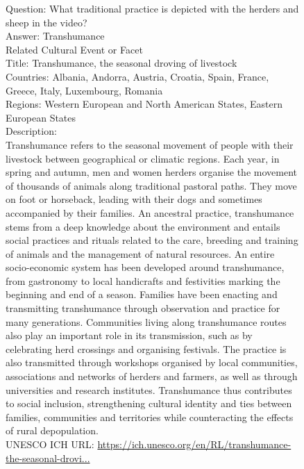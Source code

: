 \begin{figure}[H]
\begin{tcolorbox}[colback=gray!5!white,colframe=black!75!black,fonttitle=\bfseries\scriptsize,fontupper=\ttfamily\footnotesize,segmentation style={solid, black!30}]
  {\Large{Question:}} {\large{What traditional practice is depicted with the herders and sheep in the video?}}\\
  {\Large{Answer:}} {\large{Transhumance}}\\
   \tcbline
  {\Large{Related Cultural Event or Facet}}\\[4mm]
  {\normalsize{Title:}} {\normalsize{Transhumance, the seasonal droving of livestock}}\\
  {\normalsize{Countries:}} Albania, Andorra, Austria, Croatia, Spain, France, Greece, Italy, Luxembourg, Romania\\
  {\normalsize{Regions:}} Western European and North American States, Eastern European States\\
  {\normalsize{Description:}}\\
  Transhumance refers to the seasonal movement of people with their livestock between geographical or climatic regions. Each year, in spring and autumn, men and women herders organise the movement of thousands of animals along traditional pastoral paths. They move on foot or horseback, leading with their dogs and sometimes accompanied by their families. An ancestral practice, transhumance stems from a deep knowledge about the environment and entails social practices and rituals related to the care, breeding and training of animals and the management of natural resources. An entire socio-economic system has been developed around transhumance, from gastronomy to local handicrafts and festivities marking the beginning and end of a season. Families have been enacting and transmitting transhumance through observation and practice for many generations. Communities living along transhumance routes also play an important role in its transmission, such as by celebrating herd crossings and organising festivals. The practice is also transmitted through workshops organised by local communities, associations and networks of herders and farmers, as well as through universities and research institutes. Transhumance thus contributes to social inclusion, strengthening cultural identity and ties between families, communities and territories while counteracting the effects of rural depopulation.\\[2mm]
  {\normalsize{UNESCO ICH URL:}} \href{https://ich.unesco.org/en/RL/transhumance-the-seasonal-droving-of-livestock-01964}{https://ich.unesco.org/en/RL/transhumance-the-seasonal-drovi...}
\end{tcolorbox}
\end{figure}